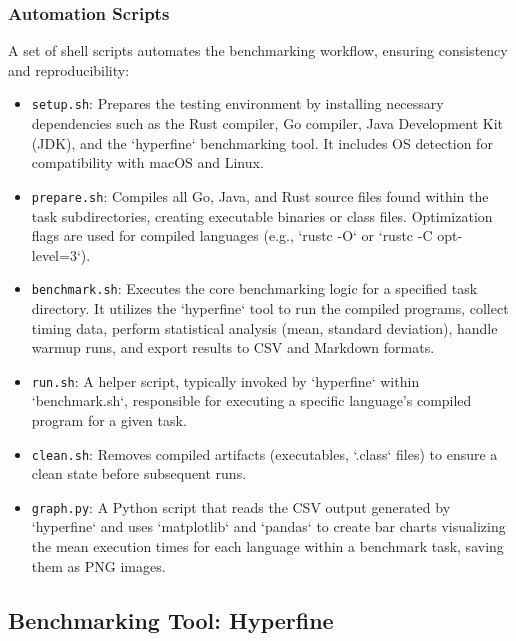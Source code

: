\subsubsection{Automation Scripts}
A set of shell scripts automates the benchmarking workflow, ensuring consistency and reproducibility:
\begin{itemize}
    \item \texttt{setup.sh}: Prepares the testing environment by installing necessary dependencies such as the Rust compiler, Go compiler, Java Development Kit (JDK), and the `hyperfine` benchmarking tool. It includes OS detection for compatibility with macOS and Linux.
    \item \texttt{prepare.sh}: Compiles all Go, Java, and Rust source files found within the task subdirectories, creating executable binaries or class files. Optimization flags are used for compiled languages (e.g., `rustc -O` or `rustc -C opt-level=3`).
    \item \texttt{benchmark.sh}: Executes the core benchmarking logic for a specified task directory. It utilizes the `hyperfine` tool to run the compiled programs, collect timing data, perform statistical analysis (mean, standard deviation), handle warmup runs, and export results to CSV and Markdown formats.
    \item \texttt{run.sh}: A helper script, typically invoked by `hyperfine` within `benchmark.sh`, responsible for executing a specific language's compiled program for a given task.
    \item \texttt{clean.sh}: Removes compiled artifacts (executables, `.class` files) to ensure a clean state before subsequent runs.
    \item \texttt{graph.py}: A Python script that reads the CSV output generated by `hyperfine` and uses `matplotlib` and `pandas` to create bar charts visualizing the mean execution times for each language within a benchmark task, saving them as PNG images.
\end{itemize}

\subsection{Benchmarking Tool: Hyperfine}

